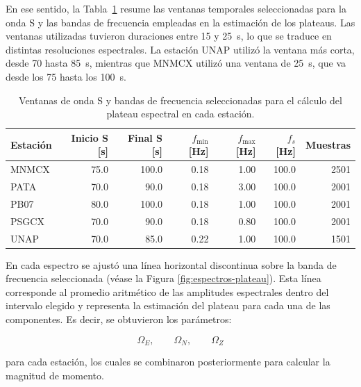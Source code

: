 \documentclass[a4paper,12pt]{article} %
\numberwithin{equation}{section} %
\numberwithin{figure}{section} %
\begin{document}
\clearpage

En ese sentido, la Tabla~\ref{tab:ventanas-plateaus} resume las ventanas temporales seleccionadas para la onda S y las bandas de frecuencia empleadas en la estimación de los plateaus. Las ventanas utilizadas tuvieron duraciones entre 15 y 25~s, lo que se traduce en distintas resoluciones espectrales. La estación UNAP utilizó la ventana más corta, desde 70 hasta 85~s, mientras que MNMCX utilizó una ventana de 25~s, que va desde los 75 hasta los 100~s.

\begin{table}[]
    \centering
    \caption{Ventanas de onda S y bandas de frecuencia seleccionadas para el cálculo del plateau espectral en cada estación.}
    \label{tab:ventanas-plateaus}
    \begin{tabular}{l r r r r r r}
        \hline
        Estación &
        Inicio S [s] &
        Final S [s] &
        $f_{\min}$ [Hz] &
        $f_{\max}$ [Hz] &
        $f_s$ [Hz] &
        Muestras \\
        \hline
        MNMCX & 75.0 & 100.0 & 0.18 & 1.00 & 100.0 & 2501 \\
        PATA  & 70.0 &  90.0 & 0.18 & 3.00 & 100.0 & 2001 \\
        PB07  & 80.0 & 100.0 & 0.18 & 1.00 & 100.0 & 2001 \\
        PSGCX & 70.0 &  90.0 & 0.18 & 0.80 & 100.0 & 2001 \\
        UNAP  & 70.0 &  85.0 & 0.22 & 1.00 & 100.0 & 1501 \\
        \hline
    \end{tabular}
\end{table}

En cada espectro se ajustó una línea horizontal discontinua sobre la banda de frecuencia seleccionada (véase la Figura \ref{fig:espectros-plateau}). Esta línea corresponde al promedio aritmético de las amplitudes espectrales dentro del intervalo elegido y representa la estimación del plateau para cada una de las componentes. Es decir, se obtuvieron los parámetros:

\[\Omega_E,\qquad \Omega_N, \qquad \Omega_Z\]

para cada estación, los cuales se combinaron posteriormente para calcular la magnitud de momento.
\end{document}
